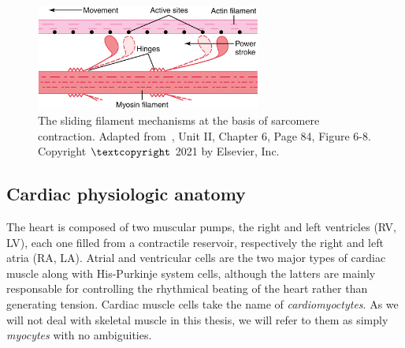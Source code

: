 \begin{figure}[!ht]
    \myfloatalign
    \includegraphics[width=0.66\textwidth]{figures/chapter01/fig_elsv_10.png}
    \caption{The sliding filament mechanisms at the basis of sarcomere contraction. Adapted from~\cite{Guyton:2021}, Unit II, Chapter 6, Page 84, Figure 6-8. Copyright $\textcopyright$ 2021 by Elsevier, Inc.}
    \label{fig:powerstroke}
\end{figure}





%
%
%
\subsection{Cardiac physiologic anatomy}\label{sec:ch1cardiac_physiologic_anatomy}
The heart is composed of two muscular pumps, the right and left ventricles (\acs{RV}, \acs{LV}), each one filled from a contractile reservoir, respectively the right and left atria (\acs{RA}, \acs{LA}). Atrial and ventricular cells are the two major types of cardiac muscle along with His-Purkinje system cells, although the latters are mainly responsable for controlling the rhythmical beating of the heart rather than generating tension. Cardiac muscle cells take the name of \textit{cardiomyoctytes}. As we will not deal with skeletal muscle in this thesis, we will refer to them as simply \textit{myocytes} with no ambiguities.

